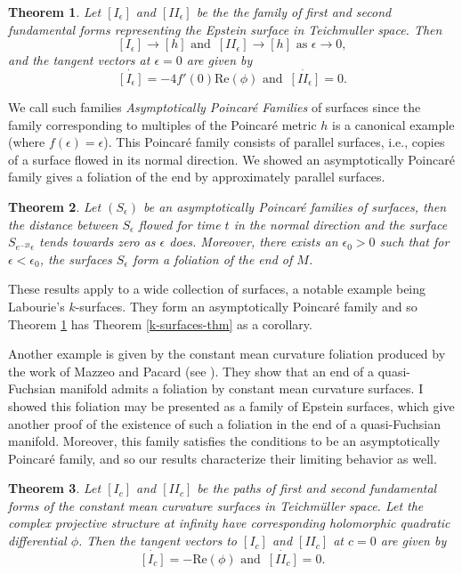 \documentclass[11pt]{amsart}
\newtheorem{thm}{Theorem}[section]
\begin{document}
\begin{thm}
\label{asym-poincare-thm}
Let $[I_\epsilon]$ and $[I\!I_\epsilon]$ be the the family of first and second fundamental forms representing the Epstein surface in Teichmuller space. 
Then
\[
[I_\epsilon] \to  [h]  \text{ and } \, [I\!I_\epsilon] \to [h]  \text{ as } \epsilon \to 0,
\]
and the tangent vectors at $\epsilon = 0$ are given by
\[
\dot{[I_\epsilon]} = -4 f'(0) \mathrm{Re}(\phi) \text{ and } \, \dot{[I\!I_\epsilon]} = 0. 
\]
\end{thm}

We call such families \emph{Asymptotically Poincar\'e Families} of surfaces since the family corresponding to multiples of the Poincar\'e metric $h$ is a canonical example (where $f(\epsilon) = \epsilon$). 
This Poincar\'e family consists of parallel surfaces, i.e., copies of a surface flowed in its normal direction. 
We showed an asymptotically Poincar\'e family gives a foliation of the end by approximately parallel surfaces.

\begin{thm}
Let $(S_\epsilon)$ be an asymptotically Poincar\'e families of surfaces, then the distance between $S_\epsilon$ flowed for time $t$ in the normal direction and the surface $S_{e^{-2t}\epsilon}$ tends towards zero as $\epsilon$ does.
Moreover, there exists an $\epsilon_0 > 0$ such that for $\epsilon < \epsilon_0$, the surfaces $S_\epsilon$ form a foliation of the end of $M$.
\end{thm}

These results apply to a wide collection of surfaces, a notable example being Labourie's $k$-surfaces. 
They form an asymptotically Poincar\'e family and so Theorem \ref{asym-poincare-thm} has Theorem \ref{k-surfaces-thm} as a corollary. 


Another example is given by the constant mean curvature foliation produced by the work of Mazzeo and Pacard (see \cite{mazzeo-pacard2011}).
They show that an end of a quasi-Fuchsian manifold admits a foliation by constant mean curvature surfaces. 
I showed this foliation may be presented as a family of Epstein surfaces, which give another proof of the existence of such a foliation in the end of a quasi-Fuchsian manifold. 
Moreover, this family satisfies the conditions to be an asymptotically Poincar\'e family, and so our results characterize their limiting behavior as well. 

\begin{thm}
\label{cmc-surfaces-thm}
Let $[I_c]$ and $[I\!I_c]$ be the paths of first and second fundamental forms of the constant mean curvature surfaces in Teichm\"uller space. 
Let the complex projective structure at infinity have corresponding holomorphic quadratic differential $\phi$. 
Then the tangent vectors to $[I_c]$ and $[I\!I_c]$ at $c=0$ are given by
\[
\dot{[I_c]} = -\mathrm{Re}(\phi) \text{ and } \, \dot{[I\!I_c]} = 0.
\]
\end{thm}
\end{document}
